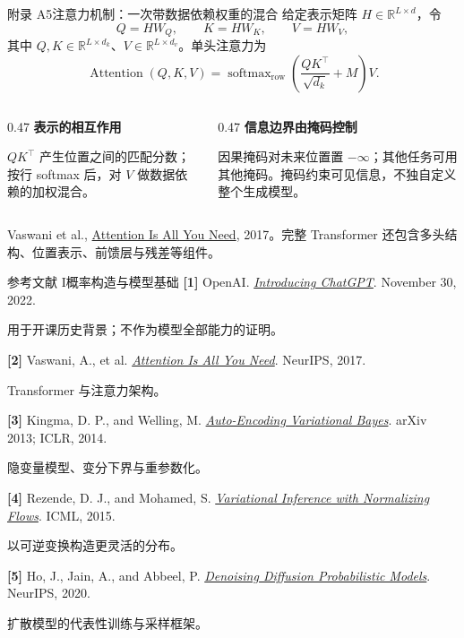 \documentclass[UTF8,aspectratio=169,11pt,fontset=none]{ctexbeamer}
\newcommand{\R}{\mathbb R}
\newcommand{\head}[1]{{\color{accent}\bfseries #1}\par\vspace{0.07cm}}
\newcommand{\mutedtext}[1]{{\small\color{muted}#1}}
\newcommand{\source}[1]{\vfill{\fontsize{6.3}{7.8}\selectfont\color{muted}#1\par}}
\begin{document}
\begin{frame}{附录 A5\quad 注意力机制：一次带数据依赖权重的混合}
给定表示矩阵 $H\in\R^{L\times d}$，令
\[
Q=HW_Q,\qquad K=HW_K,\qquad V=HW_V,
\]
其中 $Q,K\in\R^{L\times d_k}$、$V\in\R^{L\times d_v}$。单头注意力为
\[
\operatorname{Attention}(Q,K,V)
=\operatorname{softmax}_{\mathrm{row}}\!\left(\frac{QK^\top}{\sqrt{d_k}}+M\right)V.
\]
\begin{columns}[T,onlytextwidth]
\begin{column}{0.47\textwidth}
\head{表示的相互作用}
\small $QK^\top$ 产生位置之间的匹配分数；按行 softmax 后，对 $V$ 做数据依赖的加权混合。
\end{column}
\begin{column}{0.47\textwidth}
\head{信息边界由掩码控制}
\small 因果掩码对未来位置置 $-\infty$；其他任务可用其他掩码。掩码约束可见信息，不独自定义整个生成模型。
\end{column}
\end{columns}
\source{Vaswani et al., \href{https://arxiv.org/abs/1706.03762}{Attention Is All You Need}, 2017。完整 Transformer 还包含多头结构、位置表示、前馈层与残差等组件。}
\end{frame}

\begin{frame}{参考文献 I\quad 概率构造与模型基础}
\fontsize{9}{12}\selectfont
\textbf{[1]} OpenAI. \href{https://openai.com/index/chatgpt/}{\textit{Introducing ChatGPT}}. November 30, 2022.\par
\mutedtext{用于开课历史背景；不作为模型全部能力的证明。}

\vspace{0.10cm}
\textbf{[2]} Vaswani, A., et al. \href{https://arxiv.org/abs/1706.03762}{\textit{Attention Is All You Need}}. NeurIPS, 2017.\par
\mutedtext{Transformer 与注意力架构。}

\vspace{0.10cm}
\textbf{[3]} Kingma, D. P., and Welling, M. \href{https://arxiv.org/abs/1312.6114}{\textit{Auto-Encoding Variational Bayes}}. arXiv 2013; ICLR, 2014.\par
\mutedtext{隐变量模型、变分下界与重参数化。}

\vspace{0.10cm}
\textbf{[4]} Rezende, D. J., and Mohamed, S. \href{https://arxiv.org/abs/1505.05770}{\textit{Variational Inference with Normalizing Flows}}. ICML, 2015.\par
\mutedtext{以可逆变换构造更灵活的分布。}

\vspace{0.10cm}
\textbf{[5]} Ho, J., Jain, A., and Abbeel, P. \href{https://arxiv.org/abs/2006.11239}{\textit{Denoising Diffusion Probabilistic Models}}. NeurIPS, 2020.\par
\mutedtext{扩散模型的代表性训练与采样框架。}
\end{frame}
\end{document}
